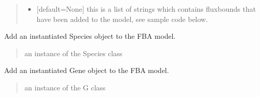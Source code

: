 \documentclass[letterpaper,12pt,english]{sphinxmanual}
\begin{document}
\begin{fulllineitems}
\begin{fulllineitems}
\begin{quote}
\begin{description}
\begin{itemize}
\item {} 
\sphinxAtStartPar
{} \textendash{} {[}default=None{]} this is a list of strings which contains fluxbounds that have been added to the model, see sample code below.

\end{itemize}

\end{description}\end{quote}

\end{fulllineitems}


\begin{fulllineitems}
\label{\detokenize{api/core:cbmpy.CBModel.Model.addSpecies}}
\pysigstartsignatures
\pysiglinewithargsret
{}
{}
{}
\pysigstopsignatures
\sphinxAtStartPar
Add an instantiated Species object to the FBA model.
\begin{quote}\begin{description}
\sphinxAtStartPar
{} \textendash{} an instance of the Species class

\end{description}\end{quote}

\end{fulllineitems}


\begin{fulllineitems}
\label{\detokenize{api/core:cbmpy.CBModel.Model.addGene}}
\pysigstartsignatures
\pysiglinewithargsret
{}
{}
{}
\pysigstopsignatures
\sphinxAtStartPar
Add an instantiated Gene object to the FBA model.
\begin{quote}\begin{description}
\sphinxAtStartPar
{} \textendash{} an instance of the G class

\end{description}\end{quote}


\end{fulllineitems}
\end{fulllineitems}
\end{document}
